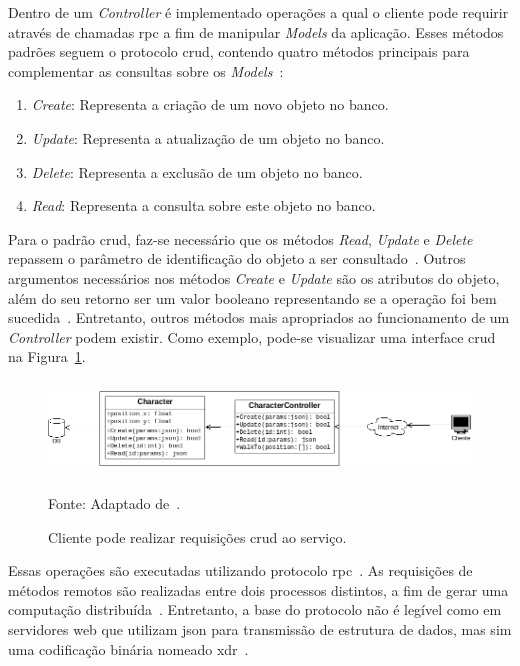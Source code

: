 Dentro de um \textit{Controller} é implementado operações a qual o cliente pode requirir através de chamadas \ac{rpc} a fim de manipular \textit{Models} da aplicação.
%
Esses métodos padrões seguem o protocolo \ac{crud}, contendo quatro métodos principais para complementar as consultas sobre os \textit{Models}~\cite{Chadwick2012Oct, LeckyThompson2008Nov}:



\begin{enumerate}
  \item \textit{Create}: Representa a criação de um novo objeto no banco.
  \item \textit{Update}: Representa a atualização de um objeto no banco.
  \item \textit{Delete}: Representa a exclusão de um objeto no banco.
  \item \textit{Read}: Representa a consulta sobre este objeto no banco.
\end{enumerate}



Para o padrão \ac{crud}, faz-se necessário que os métodos \textit{Read}, \textit{Update} e \textit{Delete} repassem o parâmetro de identificação do objeto a ser consultado~\cite{LeckyThompson2008Nov}.
%
Outros argumentos necessários nos métodos \textit{Create} e \textit{Update} são os atributos do objeto, além do seu retorno ser um valor booleano representando se a operação foi bem sucedida~\cite{Chadwick2012Oct, LeckyThompson2008Nov}.
%
Entretanto, outros métodos mais apropriados ao funcionamento de um \textit{Controller} podem existir.
%
Como exemplo, pode-se visualizar uma interface \ac{crud} na Figura~\ref{fig:crud}.



\begin{figure}[htb!]
\caption{Cliente pode realizar requisições \ac{crud} ao serviço.}
\label{fig:crud}
\includegraphics[height=2.5cm]{img/cap2/crud.png}
\centering

Fonte: Adaptado de~\cite{albion_online_unite}.
\end{figure}



Essas operações são executadas utilizando protocolo \ac{rpc}~\cite{albion_online_unite}.
%
As requisições de métodos remotos são realizadas entre dois processos distintos, a fim de gerar uma computação distribuída~\cite{rpc}.
%
Entretanto, a base do protocolo não é legível como em servidores web que utilizam \ac{json} para transmissão de estrutura de dados, mas sim uma codificação binária nomeado \ac{xdr}~\cite{xdr}.

